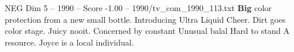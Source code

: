 \begin{textsample}{NEG Dim 5 – 1990 – Score -1.00 – 1990/tv\_com\_1990\_113.txt}  \label{ex:f5_neg_079}
\textbf{Big} color protection from a new small bottle.
Introducing Ultra Liquid Cheer.
Dirt goes color stage.
Juicy nooit.
Concerned by constant Unusual balal Hard to stand A resource.
Joyce is a local individual.

\end{textsample}
